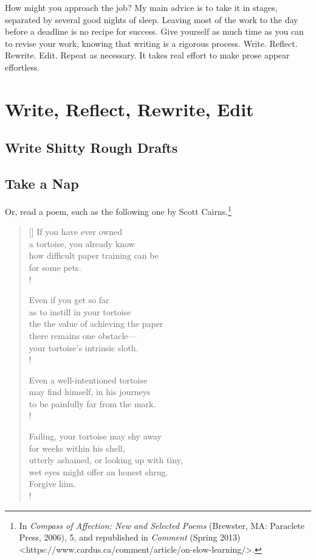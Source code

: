 \documentclass[11pt,twocolumn]{article}
\begin{document}

How might you approach the job? My main advice is to take it in stages,
separated by several good nights of sleep. Leaving most of the work to
the day before a deadline is no recipe for success. Give yourself as
much time as you can to revise your work, knowing that writing is a
rigorous process. Write. Reflect. Rewrite. Edit. Repeat as necessary. It
takes real effort to make prose appear effortless.

\section{Write, Reflect, Rewrite, Edit}

\subsection{Write Shitty Rough Drafts}

\subsection{Take a Nap}


Or, read a poem, such as the following one by Scott Cairns.\footnote{In \emph{Compass of Affection: New and Selected Poems} (Brewster, MA: Paraclete Press, 2006), 5, and republished in \emph{Comment} (Spring 2013) <https://www.cardus.ca/comment/article/on-slow-learning/>.}

\settowidth{\versewidth}{to be painfully far from the mark.}
\begin{verse}[\versewidth]
If you have ever owned\\
a tortoise, you already know\\
how difficult paper training can be\\
for some pets.\\!

Even if you get so far\\
as to instill in your tortoise\\
the the value of achieving the paper\\
there remains one obstacle—\\
your tortoise’s intrinsic sloth.\\!

Even a well-intentioned tortoise\\
may find himself, in his journeys\\
to be painfully far from the mark.\\!

Failing, your tortoise may shy away\\
for weeks within his shell,\\
utterly ashamed, or looking up with tiny,\\
wet eyes might offer an honest shrug.\\
Forgive him.\\!
\end{verse}
\end{document}
